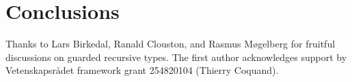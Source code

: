 
\section{Conclusions}
\label{sec:concl}


Thanks to Lars Birkedal, Ranald Clouston, and Rasmus M\o{}gelberg for
fruitful discussions on guarded recursive types.
The first author acknowledges support by Vetenskapsr\aa{}det framework
grant 254820104 (Thierry Coquand).


